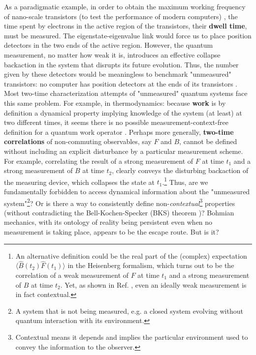 \documentclass[11pt, a4paper]{article} %
\begin{document}
As a paradigmatic example, in order to obtain the maximum working frequency of nano-scale transistors (to test the performance of modern computers) \cite{modern}, the time spent by electrons in the active region of the transistors, their {\bf dwell time}, must be measured. The eigenstate-eigenvalue link would force us to place position detectors in the two ends of the active region. However, the quantum measurement, no matter how weak it is, introduces an effective collapse backaction in the system that disrupts its future evolution. Thus, the number given by these detectors would be meaningless to benchmark "unmeasured" transistors: no computer has position detectors at the ends of its transistors \cite{tunnel1, tunnel2}. Most two-time characterization attempts of "unmeasured" quantum systems face this same problem. For example, in thermodynamics: because {\bf work} is by definition a dynamical property implying knowledge of the system (at least) at two different times, it seems there is no possible measurement-context-free definition for a quantum work operator \cite{nogo, workPb1, workPb2}. Perhaps more generally, {\bf two-time correlations} of non-commuting observables, say $F$ and $B$, cannot be defined without including an explicit disturbance by a particular measurement scheme. For example, correlating the result of a strong measurement of $F$ at time $t_1$ and a strong measurement of $B$ at time $t_2$, clearly conveys the disturbing backaction of the measuring device, which collapses the state at $t_1$.\footnote{ An alternative definition could be the real part of the (complex) expectation $\langle \hat{B}(t_2)\hat{F}(t_1)\rangle$ in the Heisenberg formalism, which turns out to be the correlation of a weak measurement \cite{Weak} of $F$ at time $t_1$ and a strong measurement of $B$ at time $t_2$. Yet, as shown in Ref. \cite{DevInPosition2}, even an ideally weak measurement is in fact contextual.} Thus, are we fundamentally forbidden to access dynamical information about the "unmeasured system"\footnote{A system that is not being measured, e.g. a closed system evolving without quantum interaction with its environment.}? Or is there a way to consistently define non-{\em contextual}\footnote{Contextual means it depends and implies the particular environment used to convey the information to the observer.} properties (without contradicting the Bell-Kochen-Specker (BKS) theorem \cite{Mermin})? Bohmian mechanics, with its ontology of reality being persistent even when no measurement is taking place, appears to be the escape route. But is it?  \vspace{-0.15cm}
\end{document}
